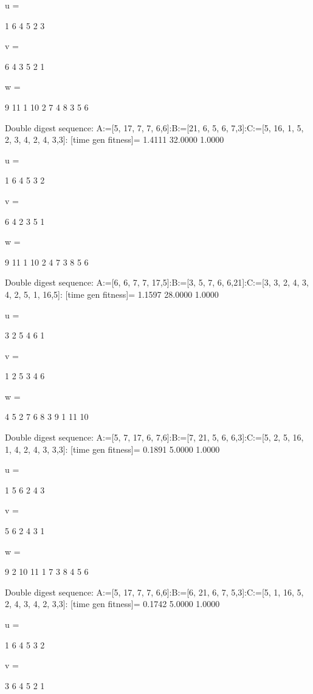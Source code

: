 u =

     1     6     4     5     2     3


v =

     6     4     3     5     2     1


w =

     9    11     1    10     2     7     4     8     3     5     6

Double digest sequence:
A:=[5, 17, 7, 7, 6,6]:B:=[21, 6, 5, 6, 7,3]:C:=[5, 16, 1, 5, 2, 3, 4, 2, 4, 3,3]:
[time gen fitness]=
    1.4111   32.0000    1.0000


u =

     1     6     4     5     3     2


v =

     6     4     2     3     5     1


w =

     9    11     1    10     2     4     7     3     8     5     6

Double digest sequence:
A:=[6, 6, 7, 7, 17,5]:B:=[3, 5, 7, 6, 6,21]:C:=[3, 3, 2, 4, 3, 4, 2, 5, 1, 16,5]:
[time gen fitness]=
    1.1597   28.0000    1.0000


u =

     3     2     5     4     6     1


v =

     1     2     5     3     4     6


w =

     4     5     2     7     6     8     3     9     1    11    10

Double digest sequence:
A:=[5, 7, 17, 6, 7,6]:B:=[7, 21, 5, 6, 6,3]:C:=[5, 2, 5, 16, 1, 4, 2, 4, 3, 3,3]:
[time gen fitness]=
    0.1891    5.0000    1.0000


u =

     1     5     6     2     4     3


v =

     5     6     2     4     3     1


w =

     9     2    10    11     1     7     3     8     4     5     6

Double digest sequence:
A:=[5, 17, 7, 7, 6,6]:B:=[6, 21, 6, 7, 5,3]:C:=[5, 1, 16, 5, 2, 4, 3, 4, 2, 3,3]:
[time gen fitness]=
    0.1742    5.0000    1.0000


u =

     1     6     4     5     3     2


v =

     3     6     4     5     2     1


